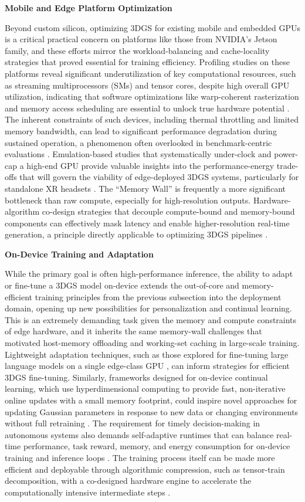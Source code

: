 \documentclass[11pt]{article}
\begin{document}
\textbf{Mobile and Edge Platform Optimization}

Beyond custom silicon, optimizing 3DGS for existing mobile and embedded GPUs is a critical practical concern on platforms like those from NVIDIA's Jetson family, and these efforts mirror the workload-balancing and cache-locality strategies that proved essential for training efficiency. Profiling studies on these platforms reveal significant underutilization of key computational resources, such as streaming multiprocessors (SMs) and tensor cores, despite high overall GPU utilization, indicating that software optimizations like warp-coherent rasterization and memory access scheduling are essential to unlock true hardware potential \cite{ref481}. The inherent constraints of such devices, including thermal throttling and limited memory bandwidth, can lead to significant performance degradation during sustained operation, a phenomenon often overlooked in benchmark-centric evaluations \cite{ref482}. Emulation-based studies that systematically under-clock and power-cap a high-end GPU provide valuable insights into the performance-energy trade-offs that will govern the viability of edge-deployed 3DGS systems, particularly for standalone XR headsets \cite{ref483}. The ``Memory Wall'' is frequently a more significant bottleneck than raw compute, especially for high-resolution outputs. Hardware-algorithm co-design strategies that decouple compute-bound and memory-bound components can effectively mask latency and enable higher-resolution real-time generation, a principle directly applicable to optimizing 3DGS pipelines \cite{ref484}.

\textbf{On-Device Training and Adaptation}

While the primary goal is often high-performance inference, the ability to adapt or fine-tune a 3DGS model on-device extends the out-of-core and memory-efficient training principles from the previous subsection into the deployment domain, opening up new possibilities for personalization and continual learning. This is an extremely demanding task given the memory and compute constraints of edge hardware, and it inherits the same memory-wall challenges that motivated host-memory offloading and working-set caching in large-scale training. Lightweight adaptation techniques, such as those explored for fine-tuning large language models on a single edge-class GPU \cite{ref485}, can inform strategies for efficient 3DGS fine-tuning. Similarly, frameworks designed for on-device continual learning, which use hyperdimensional computing to provide fast, non-iterative online updates with a small memory footprint, could inspire novel approaches for updating Gaussian parameters in response to new data or changing environments without full retraining \cite{ref486}. The requirement for timely decision-making in autonomous systems also demands self-adaptive runtimes that can balance real-time performance, task reward, memory, and energy consumption for on-device training and inference loops \cite{ref487}. The training process itself can be made more efficient and deployable through algorithmic compression, such as tensor-train decomposition, with a co-designed hardware engine to accelerate the computationally intensive intermediate steps \cite{ref479}.
\end{document}
